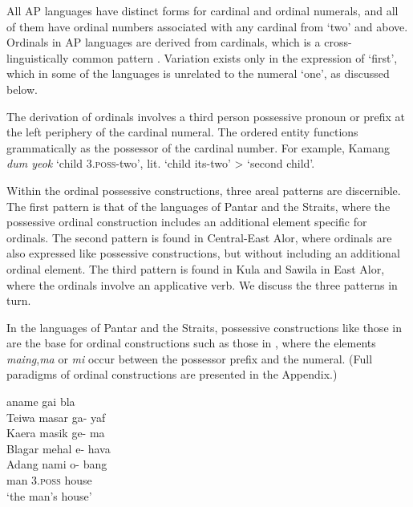 All AP languages have distinct forms for cardinal and ordinal numerals, and all of them have ordinal numbers associated with any cardinal from `two' and above. Ordinals in AP languages are derived from cardinals, which is a cross-linguistically common pattern \citep{StolzEtAl2013}. Variation exists only in the expression of `first', which in some of the languages is unrelated to the numeral `one', as discussed below. 

The derivation of ordinals involves a third person possessive pronoun or prefix at the left periphery of the cardinal numeral. The ordered entity functions grammatically as the possessor of the cardinal number. For example, Kamang \textit{dum yeok} `child 3.\textsc{poss}{}-two', lit. `child its-two' {\textgreater} `second child'. 

Within the ordinal possessive constructions, three areal patterns are discernible. The first pattern is that of the languages of Pantar and the Straits, where the possessive ordinal construction includes an additional element specific for ordinals. The second pattern is found in Central-East Alor, where ordinals are also expressed like possessive constructions, but without including an additional ordinal element. The third pattern is found in Kula and Sawila in East Alor, where the ordinals involve an applicative verb. We discuss the three patterns in turn.

In the languages of Pantar and the Straits, possessive constructions like those in  are the base for ordinal constructions such as those in , where the elements \textit{maing},\textit{ma} or \textit{mi} occur between the possessor prefix and the numeral. (Full paradigms of ordinal constructions are presented in the Appendix.) 


\let\eachwordone=\it
\let\eachwordtwo=\it
\let\eachwordthree=\it
\let\eachwordfour=\it
\let\eachwordfive=\it 

\ea\label{bkm:Ref342649616}
    aname    gai    bla\\
  Teiwa      masar    ga-    yaf\\
  Kaera      masik    ge-    ma\\
  Blagar      mehal    {\textglotstop}e-    hava\\
  Adang       nami    o-    bang\\
   { }        man   \textsc{3.poss}  house  \\
\glt `the man's house'  \\ 
\z

